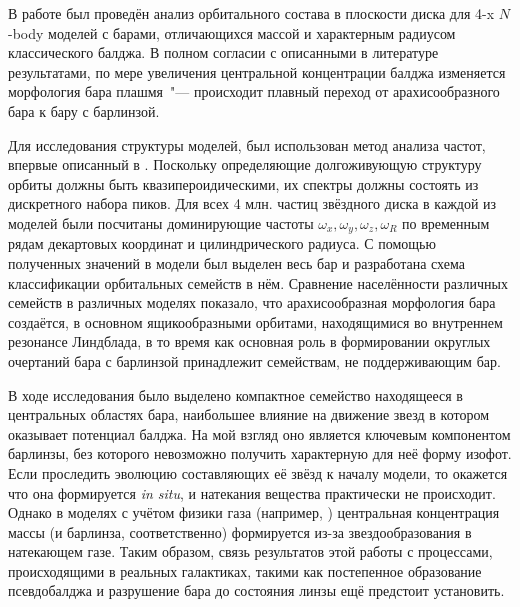 \documentclass{trlnotes}
\begin{document}
В работе был проведён анализ орбитального состава в плоскости диска для 4-x $N$-body моделей с барами,
отличающихся массой и характерным радиусом классического балджа.
В полном согласии с описанными в литературе результатами, по мере увеличения центральной концентрации
балджа изменяется морфология бара плашмя~"--- происходит плавный переход от арахисообразного бара к 
бару с барлинзой.

Для исследования структуры моделей, был использован метод анализа частот, впервые описанный в \citet{binney1982}.
Поскольку определяющие долгоживующую структуру орбиты должны быть квазипероидическими, их спектры должны состоять из
дискретного набора пиков. Для всех 4 млн. частиц звёздного диска в каждой из моделей были посчитаны доминирующие частоты
$ω_x, ω_y, ω_z, ω_R$ по временным рядам декартовых координат и цилиндрического радиуса. 
С помощью полученных значений в модели был выделен весь бар и разработана схема классификации орбитальных семейств в нём.
Сравнение населённости различных семейств в различных моделях показало, что арахисообразная морфология бара создаётся, в 
основном ящикообразными орбитами, находящимися во внутреннем резонансе Линдблада, в то время как основная роль в формировании
округлых очертаний бара с барлинзой принадлежит семействам, не поддерживающим бар.

В ходе исследования было выделено компактное семейство находящееся в центральных областях бара, наибольшее
влияние на движение звезд в котором оказывает потенциал балджа. На мой взгляд оно является ключевым компонентом барлинзы, без
которого невозможно получить характерную для неё форму изофот. Если проследить эволюцию составляющих её звёзд к началу модели,
то окажется что она формируется \emph{in situ}, и натекания вещества практически не происходит. Однако в моделях с учётом физики газа
(например, \cite{athanassoula2015}) центральная концентрация массы (и барлинза, соответственно) формируется из-за 
звездообразования в натекающем газе. Таким образом, связь результатов этой работы с процессами, происходящими в реальных галактиках, такими
как постепенное образование псевдобалджа и разрушение бара до состояния линзы \citep{combes2011} ещё предстоит установить.
\end{document}
